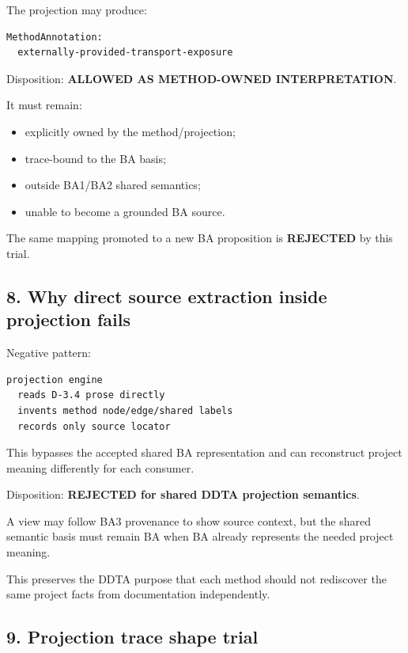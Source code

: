\documentclass[11pt,a4paper]{article}
\providecommand{\tightlist}{\setlength{\itemsep}{0pt}\setlength{\parskip}{0pt}}
\begin{document}
The projection may produce:

\begin{verbatim}
MethodAnnotation:
  externally-provided-transport-exposure
\end{verbatim}

Disposition: \textbf{ALLOWED AS METHOD-OWNED INTERPRETATION}.

It must remain:

\begin{itemize}
\tightlist
\item
  explicitly owned by the method/projection;
\item
  trace-bound to the BA basis;
\item
  outside BA1/BA2 shared semantics;
\item
  unable to become a grounded BA source.
\end{itemize}

The same mapping promoted to a new BA proposition is \textbf{REJECTED} by this trial.

\subsection{8. Why direct source extraction inside projection fails}\label{8-why-direct-source-extraction-inside-projection-fails}

Negative pattern:

\begin{verbatim}
projection engine
  reads D-3.4 prose directly
  invents method node/edge/shared labels
  records only source locator
\end{verbatim}

This bypasses the accepted shared BA representation and can reconstruct project meaning differently for each consumer.

Disposition: \textbf{REJECTED for shared DDTA projection semantics}.

A view may follow BA3 provenance to show source context, but the shared semantic basis must remain BA when BA already represents the needed project meaning.

This preserves the DDTA purpose that each method should not rediscover the same project facts from documentation independently.

\subsection{9. Projection trace shape trial}\label{9-projection-trace-shape-trial}
\end{document}
